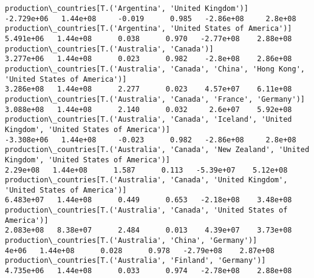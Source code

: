 \documentclass[11pt]{article}
\begin{document}
\begin{Verbatim}[commandchars=\\\{\}]
production\_countries[T.('Argentina', 'United Kingdom')]                                                                                                                               -2.729e+06   1.44e+08     -0.019      0.985   -2.86e+08     2.8e+08
production\_countries[T.('Argentina', 'United States of America')]                                                                                                                      5.491e+06   1.44e+08      0.038      0.970   -2.77e+08    2.88e+08
production\_countries[T.('Australia', 'Canada')]                                                                                                                                        3.277e+06   1.44e+08      0.023      0.982    -2.8e+08    2.86e+08
production\_countries[T.('Australia', 'Canada', 'China', 'Hong Kong', 'United States of America')]                                                                                      3.286e+08   1.44e+08      2.277      0.023    4.57e+07    6.11e+08
production\_countries[T.('Australia', 'Canada', 'France', 'Germany')]                                                                                                                   3.088e+08   1.44e+08      2.140      0.032     2.6e+07    5.92e+08
production\_countries[T.('Australia', 'Canada', 'Iceland', 'United Kingdom', 'United States of America')]                                                                              -3.308e+06   1.44e+08     -0.023      0.982   -2.86e+08     2.8e+08
production\_countries[T.('Australia', 'Canada', 'New Zealand', 'United Kingdom', 'United States of America')]                                                                            2.29e+08   1.44e+08      1.587      0.113   -5.39e+07    5.12e+08
production\_countries[T.('Australia', 'Canada', 'United Kingdom', 'United States of America')]                                                                                          6.483e+07   1.44e+08      0.449      0.653   -2.18e+08    3.48e+08
production\_countries[T.('Australia', 'Canada', 'United States of America')]                                                                                                            2.083e+08   8.38e+07      2.484      0.013    4.39e+07    3.73e+08
production\_countries[T.('Australia', 'China', 'Germany')]                                                                                                                                  4e+06   1.44e+08      0.028      0.978   -2.79e+08    2.87e+08
production\_countries[T.('Australia', 'Finland', 'Germany')]                                                                                                                            4.735e+06   1.44e+08      0.033      0.974   -2.78e+08    2.88e+08

\end{Verbatim}
\end{document}
